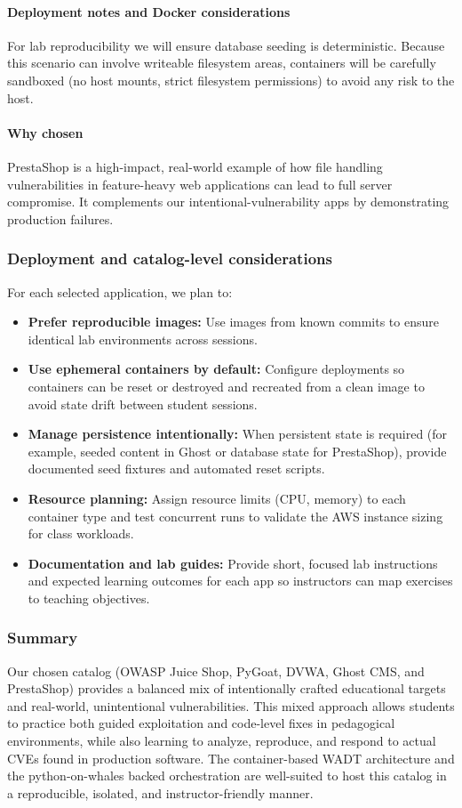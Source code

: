 \documentclass[12pt]{article}
\begin{document}
\paragraph{Deployment notes and Docker considerations}
For lab reproducibility we will ensure database seeding is deterministic. Because this scenario can involve writeable filesystem areas, containers will be carefully sandboxed (no host mounts, strict filesystem permissions) to avoid any risk to the host.

\paragraph{Why chosen}
PrestaShop is a high-impact, real-world example of how file handling vulnerabilities in feature-heavy web applications can lead to full server compromise. It complements our intentional-vulnerability apps by demonstrating production failures.

\subsubsection{Deployment and catalog-level considerations}
For each selected application, we plan to:
\begin{itemize}
    \item \textbf{Prefer reproducible images:} Use images from known commits to ensure identical lab environments across sessions.
    \item \textbf{Use ephemeral containers by default:} Configure deployments so containers can be reset or destroyed and recreated from a clean image to avoid state drift between student sessions.
    \item \textbf{Manage persistence intentionally:} When persistent state is required (for example, seeded content in Ghost or database state for PrestaShop), provide documented seed fixtures and automated reset scripts.
    \item \textbf{Resource planning:} Assign resource limits (CPU, memory) to each container type and test concurrent runs to validate the AWS instance sizing for class workloads.
    \item \textbf{Documentation and lab guides:} Provide short, focused lab instructions and expected learning outcomes for each app so instructors can map exercises to teaching objectives.
\end{itemize}

\subsubsection{Summary}
Our chosen catalog (OWASP Juice Shop, PyGoat, DVWA, Ghost CMS, and PrestaShop) provides a balanced mix of intentionally crafted educational targets and real-world, unintentional vulnerabilities. This mixed approach allows students to practice both guided exploitation and code-level fixes in pedagogical environments, while also learning to analyze, reproduce, and respond to actual CVEs found in production software. The container-based WADT architecture and the python-on-whales backed orchestration are well-suited to host this catalog in a reproducible, isolated, and instructor-friendly manner.
\end{document}
